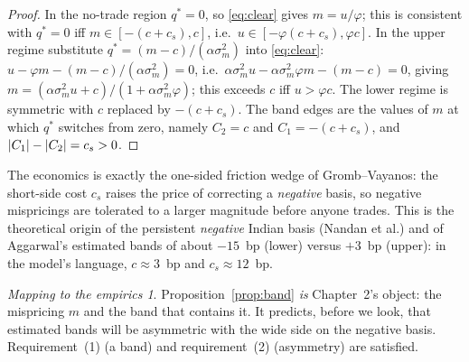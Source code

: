 \documentclass[11pt,a4paper]{article}
\DeclarePairedDelimiter{\abs}{\lvert}{\rvert}
\theoremstyle{plain}
\theoremstyle{definition}
\theoremstyle{remark}
\newtheorem*{takeaway}{Mapping to the empirics}
\begin{document}
\begin{proof}
In the no-trade region $q^\ast=0$, so \eqref{eq:clear} gives $m=u/\varphi$; this is consistent with $q^\ast=0$ iff $m\in[-(c+c_s),c]$, i.e.\ $u\in[-\varphi(c+c_s),\varphi c]$. In the upper regime substitute $q^\ast=(m-c)/(\alpha\sigma_m^2)$ into \eqref{eq:clear}: $u-\varphi m-(m-c)/(\alpha\sigma_m^2)=0$, i.e.\ $\alpha\sigma_m^2 u - \alpha\sigma_m^2\varphi m - (m-c)=0$, giving $m=(\alpha\sigma_m^2 u + c)/(1+\alpha\sigma_m^2\varphi)$; this exceeds $c$ iff $u>\varphi c$. The lower regime is symmetric with $c$ replaced by $-(c+c_s)$. The band edges are the values of $m$ at which $q^\ast$ switches from zero, namely $C_2=c$ and $C_1=-(c+c_s)$, and $\abs{C_1}-\abs{C_2}=c_s>0$.
\end{proof}

The economics is exactly the one-sided friction wedge of Gromb--Vayanos: the short-side cost $c_s$ raises the price of correcting a \emph{negative} basis, so negative mispricings are tolerated to a larger magnitude before anyone trades. This is the theoretical origin of the persistent \emph{negative} Indian basis (Nandan et al.) and of Aggarwal's estimated bands of about $-15$~bp (lower) versus $+3$~bp (upper): in the model's language, $c\approx 3$~bp and $c_s\approx 12$~bp.

\begin{takeaway}
Proposition~\ref{prop:band} \emph{is} Chapter~2's object: the mispricing $m$ and the band that contains it. It predicts, before we look, that estimated bands will be asymmetric with the wide side on the negative basis. Requirement~(1) (a band) and requirement~(2) (asymmetry) are satisfied.
\end{takeaway}
\end{document}
